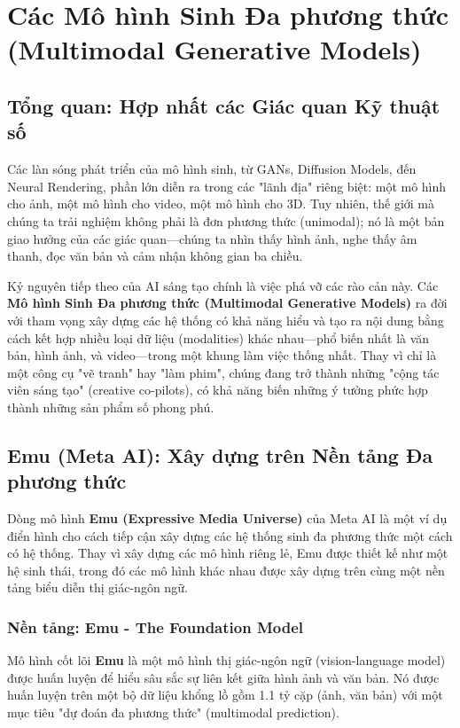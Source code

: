 \section{Các Mô hình Sinh Đa phương thức (Multimodal Generative Models)}
\label{sec:multimodal_generative_models}

\subsection{Tổng quan: Hợp nhất các Giác quan Kỹ thuật số}
\label{subsec:multimodal_gen_overview}
Các làn sóng phát triển của mô hình sinh, từ GANs, Diffusion Models, đến Neural Rendering, phần lớn diễn ra trong các "lãnh địa" riêng biệt: một mô hình cho ảnh, một mô hình cho video, một mô hình cho 3D. Tuy nhiên, thế giới mà chúng ta trải nghiệm không phải là đơn phương thức (unimodal); nó là một bản giao hưởng của các giác quan—chúng ta nhìn thấy hình ảnh, nghe thấy âm thanh, đọc văn bản và cảm nhận không gian ba chiều.

Kỷ nguyên tiếp theo của AI sáng tạo chính là việc phá vỡ các rào cản này. Các \textbf{Mô hình Sinh Đa phương thức (Multimodal Generative Models)} ra đời với tham vọng xây dựng các hệ thống có khả năng hiểu và tạo ra nội dung bằng cách kết hợp nhiều loại dữ liệu (modalities) khác nhau—phổ biến nhất là văn bản, hình ảnh, và video—trong một khung làm việc thống nhất. Thay vì chỉ là một công cụ "vẽ tranh" hay "làm phim", chúng đang trở thành những "cộng tác viên sáng tạo" (creative co-pilots), có khả năng biến những ý tưởng phức hợp thành những sản phẩm số phong phú.

\subsection{Emu (Meta AI): Xây dựng trên Nền tảng Đa phương thức}
\label{subsec:emu_meta}
Dòng mô hình \textbf{Emu (Expressive Media Universe)} của Meta AI là một ví dụ điển hình cho cách tiếp cận xây dựng các hệ thống sinh đa phương thức một cách có hệ thống. Thay vì xây dựng các mô hình riêng lẻ, Emu được thiết kế như một hệ sinh thái, trong đó các mô hình khác nhau được xây dựng trên cùng một nền tảng biểu diễn thị giác-ngôn ngữ.

\subsubsection{Nền tảng: Emu - The Foundation Model}
\label{subsubsec:emu_foundation}
Mô hình cốt lõi \textbf{Emu} \cite{Dai2023_Emu} là một mô hình thị giác-ngôn ngữ (vision-language model) được huấn luyện để hiểu sâu sắc sự liên kết giữa hình ảnh và văn bản. Nó được huấn luyện trên một bộ dữ liệu khổng lồ gồm 1.1 tỷ cặp (ảnh, văn bản) với một mục tiêu "dự đoán đa phương thức" (multimodal prediction).

